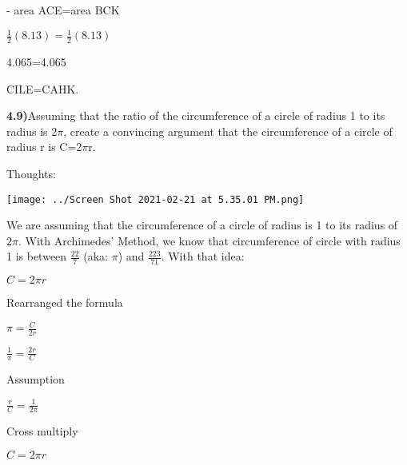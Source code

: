 \documentclass{article}
\begin{document}
\vspace{2mm}

- area ACE=area BCK

\vspace{2mm}

$\frac{1}{2}(8.13)=\frac{1}{2}(8.13)$

\vspace{2mm}

4.065=4.065

\vspace{2mm}

CILE=CAHK.




\newpage

\textbf{4.9)}Assuming that the ratio of the circumference of a circle of radius 1 to its radius is 2$\pi$, create a convincing argument that the circumference of a circle of radius r is C=2$\pi$r.

Thoughts:

\texttt{[image: ../Screen Shot 2021-02-21 at 5.35.01 PM.png]}

We are assuming that the circumference of a circle of radius is 1 to its radius of $2\pi$. With Archimedes' Method, we know that circumference of circle with radius 1 is between $\frac{22}{7}$ (aka: $\pi$) and $\frac{223}{71}$. With that idea:

$C=2\pi r$

\vspace{2mm}

Rearranged the formula

\vspace{2mm}

$\pi=\frac{C}{2r}$

\vspace{2mm}

$\frac{1}{\pi}=\frac{2r}{C}$

\vspace{2mm}

Assumption

\vspace{2mm}

$\frac{r}{C}=\frac{1}{2\pi}$

\vspace{2mm}

Cross multiply

\vspace{2mm}

$C=2\pi r$


\end{document}
